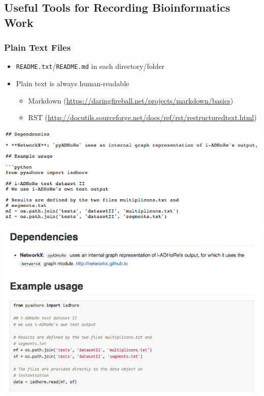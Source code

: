 %

\subsection{Useful Tools for Recording Bioinformatics Work}
\begin{frame}
  \frametitle{Plain Text Files}
  \begin{itemize}
    \item \texttt{README.txt}/\texttt{README.md} in each directory/folder
    \item Plain text is always human-readable
    \begin{itemize}
      \item Markdown (\url{https://daringfireball.net/projects/markdown/basics})
      \item RST (\url{http://docutils.sourceforge.net/docs/ref/rst/restructuredtext.html})
    \end{itemize}
  \end{itemize}
  \begin{center}
    \includegraphics[width=.4\textwidth]{images/markdown_before}
    \includegraphics[width=.4\textwidth]{images/markdown_after}
  \end{center}
\end{frame}
   
